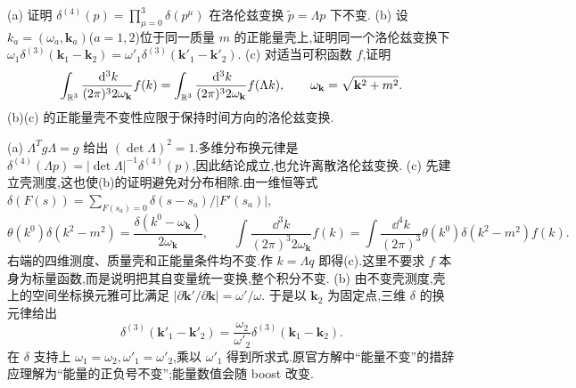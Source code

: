 \begin{exercise}
(a) 证明 $\delta^{(4)}(p)=\prod_{\mu=0}^3\delta(p^\mu)$ 在洛伦兹变换 $\widetilde p=\Lambda p$ 下不变.
(b) 设 $k_a=(\omega_a,\mathbf k_a)$($a=1,2$)位于同一质量 $m$ 的正能量壳上,证明同一个洛伦兹变换下
$\omega_1\delta^{(3)}(\mathbf k_1-\mathbf k_2)=\omega'_1\delta^{(3)}(\mathbf k'_1-\mathbf k'_2)$.
(c) 对适当可积函数 $f$,证明
\[
\int_{\mathbb R^3}\frac{\,\mathrm d^3k}{(2\pi)^3 2\omega_{\mathbf k}}f(k)
=\int_{\mathbb R^3}\frac{\,\mathrm d^3k}{(2\pi)^3 2\omega_{\mathbf k}}f(\Lambda k),\qquad
\omega_{\mathbf k}=\sqrt{\mathbf k^2+m^2}.
\]
(b)(c) 的正能量壳不变性应限于保持时间方向的洛伦兹变换.
\end{exercise}
\begin{solution}
(a) $\Lambda^Tg\Lambda=g$ 给出 $(\det\Lambda)^2=1$.多维分布换元律是 $\delta^{(4)}(\Lambda p)=|\det\Lambda|^{-1}\delta^{(4)}(p)$,因此结论成立,也允许离散洛伦兹变换.
(c) 先建立壳测度,这也使(b)的证明避免对分布相除.由一维恒等式 $\delta(F(s))=\sum_{F(s_a)=0}\delta(s-s_a)/|F'(s_a)|$,
\[
\theta(k^0)\delta(k^2-m^2)=\frac{\delta(k^0-\omega_{\mathbf k})}{2\omega_{\mathbf k}},\qquad
\int\frac{\dd^3k}{(2\pi)^3 2\omega_{\mathbf k}}f(k)
=\int\frac{\dd^4k}{(2\pi)^3}\theta(k^0)\delta(k^2-m^2)f(k).
\]
右端的四维测度、质量壳和正能量条件均不变.作 $k=\Lambda q$ 即得(c).这里不要求 $f$ 本身为标量函数,而是说明把其自变量统一变换,整个积分不变.
(b) 由不变壳测度,壳上的空间坐标换元雅可比满足
$|\partial\mathbf k'/\partial\mathbf k|=\omega'/\omega$.
于是以 $\mathbf k_2$ 为固定点,三维 $\delta$ 的换元律给出
\[
\delta^{(3)}(\mathbf k'_1-\mathbf k'_2)
=\frac{\omega_2}{\omega'_2}\delta^{(3)}(\mathbf k_1-\mathbf k_2).
\]
在 $\delta$ 支持上 $\omega_1=\omega_2,\omega'_1=\omega'_2$,乘以 $\omega'_1$ 得到所求式.原官方解中“能量不变”的措辞应理解为“能量的正负号不变”;能量数值会随 boost 改变.
\end{solution}

